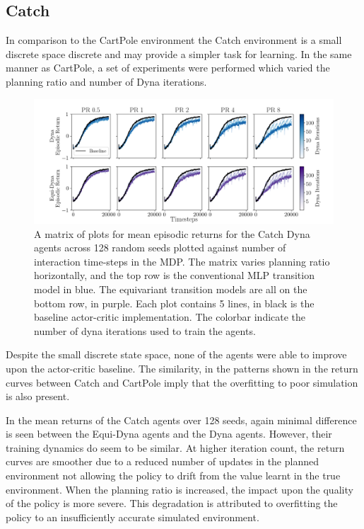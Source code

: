 \subsection{Catch}
In comparison to the CartPole environment the Catch environment is a small discrete space discrete and may provide a simpler task for learning.
In the same manner as CartPole, a set of experiments were performed which varied the planning ratio and number of Dyna iterations.
\begin{figure}[h!]
	\centering
	\includegraphics[width=\textwidth]{Figures/dyna_sweep_catch.png}
	\caption{A matrix of plots for mean episodic returns for the Catch Dyna agents across 128 random seeds
		plotted against number of interaction time-steps in the MDP. The matrix varies planning ratio horizontally, and the top row is the conventional MLP transition model in blue. The equivariant transition models are all on the bottom row, in purple. Each plot contains 5 lines, in black is the baseline actor-critic implementation. The colorbar indicate the number of dyna iterations used to train the agents.}
	\label{fig:catch_dyna}
\end{figure}
Despite the small discrete state space, none of the agents were able to improve upon the actor-critic baseline. The similarity, in the patterns shown in the return curves between Catch and CartPole imply that the overfitting to poor simulation is also present.

In the mean returns of the Catch agents over 128 seeds, again minimal difference is seen between the Equi-Dyna agents and the Dyna agents. However, their training dynamics do seem to be similar. At higher iteration count, the return curves are smoother due to a reduced number of updates in the planned environment not allowing the policy to drift from the value learnt in the true environment. When the planning ratio is increased, the impact upon the quality of the policy is more severe. This degradation is attributed to overfitting the policy to an insufficiently accurate simulated environment.

